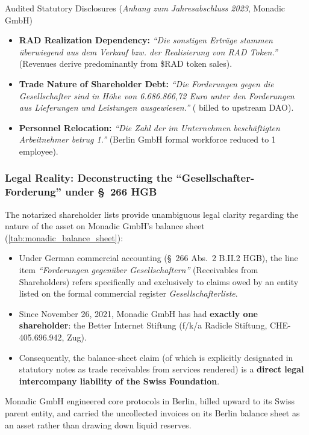 \documentclass[a4paper,11pt,twoside,parskip=half-,headings=small]{scrartcl}
\begin{document}
\begin{keybox}{Audited Statutory Disclosures (\emph{Anhang zum Jahresabschluss 2023}, Monadic GmbH)}
\begin{itemize}[nosep]
  \item \textbf{RAD Realization Dependency:} \emph{``Die sonstigen Erträge stammen überwiegend aus dem Verkauf bzw. der Realisierung von RAD Token.''} (Revenues derive predominantly from \$RAD token sales).
  \item \textbf{Trade Nature of Shareholder Debt:} \emph{``Die Forderungen gegen die Gesellschafter sind in Höhe von 6.686.866,72 Euro unter den Forderungen aus Lieferungen und Leistungen ausgewiesen.''} ( billed to upstream DAO).
  \item \textbf{Personnel Relocation:} \emph{``Die Zahl der im Unternehmen beschäftigten Arbeitnehmer betrug 1.''} (Berlin GmbH formal workforce reduced to 1 employee).
\end{itemize}
\end{keybox}

\clearpage

\subsubsection{Legal Reality: Deconstructing the ``Gesellschafter-Forderung'' under \S~266 HGB}
\label{sec:deconstructing_forderung}

The notarized shareholder lists provide unambiguous legal clarity regarding the nature of the \textbf{} asset on Monadic GmbH's balance sheet (\cref{tab:monadic_balance_sheet}):
\begin{itemize}[nosep]
  \item Under German commercial accounting (\S~266 Abs.~2 B.II.2 HGB), the line item \emph{``Forderungen gegen{\"u}ber Gesellschaftern''} (Receivables from Shareholders) refers specifically and exclusively to claims owed by an entity listed on the formal commercial register \emph{Gesellschafterliste}.
  \item Since November 26, 2021, Monadic GmbH has had \textbf{exactly one shareholder}: the Better Internet Stiftung (f/k/a Radicle Stiftung, CHE-405.696.942, Zug).
  \item Consequently, the \textbf{} balance-sheet claim (of which  is explicitly designated in statutory notes as trade receivables from services rendered) is a \textbf{direct legal intercompany liability of the Swiss Foundation}.
\end{itemize}
Monadic GmbH engineered core protocols in Berlin, billed  upward to its Swiss parent entity, and carried the uncollected invoices on its Berlin balance sheet as an asset rather than drawing down liquid reserves.
\end{document}
